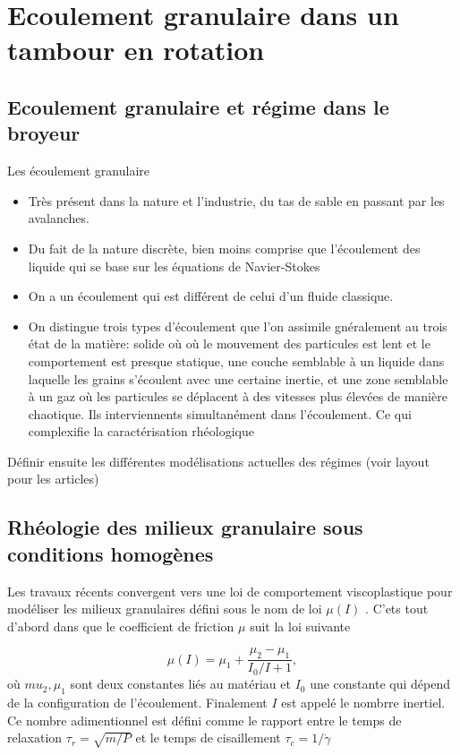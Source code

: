 
\section{Ecoulement granulaire dans un tambour en rotation}
\subsection{Ecoulement granulaire et régime dans le broyeur}
Les écoulement granulaire

\begin{itemize}
    \item Très présent dans la nature et l'industrie, du tas de sable en passant par les avalanches.
    \item Du fait de la nature discrète, bien moins comprise que l'écoulement des liquide qui se base sur les équations de Navier-Stokes
    \item On a un écoulement qui est différent de celui d'un fluide classique.
    \item On distingue trois types d'écoulement que l'on assimile gnéralement au trois état de la matière: solide où où le mouvement des particules est lent et le comportement est presque statique, une couche semblable à un liquide dans laquelle les grains s'écoulent avec une certaine inertie, et une zone semblable à un gaz où les particules se déplacent à des vitesses plus élevées de manière chaotique. Ils interviennents simultanément dans l'écoulement. Ce qui complexifie la caractérisation rhéologique
\end{itemize}

Définir ensuite les différentes modélisations actuelles des régimes (voir layout pour les articles)

\subsection{Rhéologie des milieux granulaire sous conditions homogènes}

Les travaux récents convergent vers une loi de comportement viscoplastique pour modéliser les milieux granulaires défini sous le nom de loi $\mu(I)$ \cite{gdr_midi_dense_2004,jop_constitutive_2006}.
C'ets tout d'abord dans \cite{POULIQUEN_FORTERRE_2002} que le coefficient de friction $\mu$ suit la loi suivante

\begin{equation*}
    \mu(I) = \mu_1 + \frac{\mu_2- \mu_1}{I_0/I + 1},
\end{equation*}où $mu_2, \mu_1$ sont deux constantes liés au matériau et $I_0$ une constante qui dépend de la configuration de l'écoulement. Finalement $I$ est appelé le nombrre inertiel. Ce nombre adimentionnel est défini comme le rapport entre le temps de relaxation $\tau_r = \sqrt{m/P}$ et le temps de cisaillement $\tau_c = 1 / \dot \gamma$

